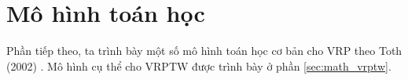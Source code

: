 \section{Mô hình toán học}
\label{sec:math}

Phần tiếp theo, ta trình bày một số mô hình toán học cơ bản cho VRP theo Toth (2002) \cite{toth2002vehicle}. Mô hình cụ thể cho VRPTW được trình bày ở phần \ref{sec:math_vrptw}. 


